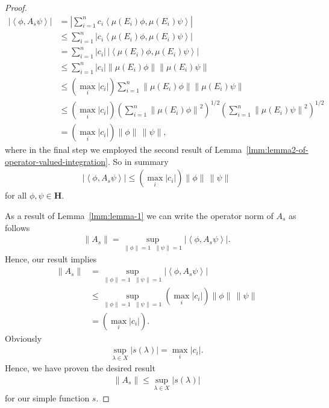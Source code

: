 \begin{proof}
\begin{align}
    \left\lvert \left< \phi, A_s \psi \right> \right\rvert &= \left\lvert \sum_{i = 1}^n c_i \left< \mu(E_i) \phi, \mu(E_i) \psi \right> \right\rvert \\
                                                 &\le \sum_{i = 1}^n \left\lvert c_i \left< \mu(E_i) \phi, \mu(E_i) \psi \right> \right\rvert \\
                                                 &= \sum_{i = 1}^n \left\lvert c_i \right\rvert \, \left\lvert \left< \mu(E_i) \phi, \mu(E_i) \psi \right> \right\rvert \\
                                                 &\le \sum_{i = 1}^n \left\lvert c_i \right\rvert \left\| \mu(E_i) \phi \right\| \left\| \mu(E_i) \psi \right\| \\
                                                 &\le \left( \max_i \left\lvert c_i \right\rvert \right)  \sum_{i = 1}^n \left\| \mu(E_i) \phi \right\| \left\| \mu(E_i) \psi \right\| \\
                                                 &\le \left( \max_i \left\lvert c_i \right\rvert \right) \left( \sum_{i = 1}^n \left\| \mu(E_i) \phi \right\|^2 \right)^{1/2} \left( \sum_{i = 1}^n \left\| \mu(E_i) \psi \right\|^2 \right)^{1/2} \\
                                                 &= \left( \max_i \left\lvert c_i \right\rvert \right) \|\phi\| \, \|\psi\|,
\end{align}
where in the final step we employed the second result of Lemma~\ref{lmm:lemma2-of-operator-valued-integration}. So in summary
\begin{align}
    \left\lvert \left< \phi, A_s \psi \right> \right\rvert \le \left( \max_i \left\lvert c_i \right\rvert \right) \|\phi\| \, \|\psi\|
\end{align}
for all $\phi, \psi \in \mathbf{H}$.

As a result of Lemma~\ref{lmm:lemma-1} we can write the operator norm of $A_s$ as follows
\begin{align}
    \|A_s\| = \sup_{\|\phi\| = 1 \text{ } \|\psi\| = 1} \left\lvert \left< \phi, A_s \psi \right> \right\rvert.
\end{align}
Hence, our result implies
\begin{align}
    \|A_s\| &= \sup_{\|\phi\| = 1 \text{ } \|\psi\| = 1} \left\lvert \left< \phi, A_s \psi \right> \right\rvert \\
            &\le \sup_{\|\phi\| = 1 \text{ } \|\psi\| = 1} \left( \max_i \left\lvert c_i \right\rvert \right) \|\phi\| \, \|\psi\| \\
            &= \left( \max_i \left\lvert c_i \right\rvert \right).
\end{align}
Obviously
\begin{align}
    \sup_{\lambda \in X} \lvert s(\lambda) \rvert = \max_i \left\lvert c_i \right\rvert.
\end{align}
Hence, we have proven the desired result
\begin{align}
    \|A_s\|  \le \sup_{\lambda \in X} \lvert s(\lambda) \rvert
\end{align}
for our simple function $s$.
\end{proof}

